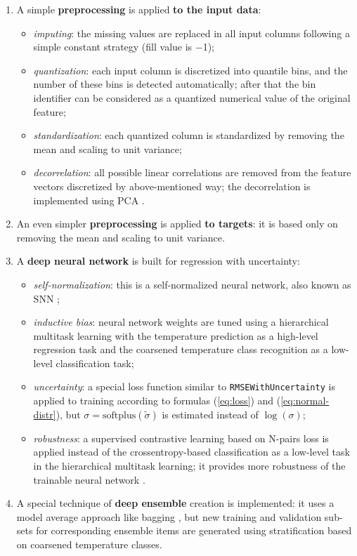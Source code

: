 \documentclass{article}
\begin{document}
\begin{enumerate}
    \item A simple \textbf{preprocessing} is applied \textbf{to the input data}:
        \begin{itemize} 
            \item \emph{imputing}: the missing values are replaced in all input columns following a simple constant strategy (fill value is $-$1);
            \item \emph{quantization}: each input column is discretized into quantile bins, and the number of these bins is detected automatically; after that the bin identifier can be considered as a quantized numerical value of the original feature; 
            \item \emph{standardization}: each quantized column is standardized by removing the mean and scaling to unit variance;
            \item \emph{decorrelation}: all possible linear correlations are removed from the feature vectors discretized by above-mentioned way; the decorrelation is implemented using PCA \cite{esbensen2002multivariate}.
        \end{itemize} 
    \item An even simpler \textbf{preprocessing} is applied \textbf{to targets}: it is based only on removing the mean and scaling to unit variance.
    \item A \textbf{deep neural network} is built for regression with uncertainty:
        \begin{itemize} 
            \item \emph{self-normalization}: this is a self-normalized neural network, also known as SNN \cite{Klambauer2017};
            \item \emph{inductive bias}: neural network weights are tuned using a hierarchical multitask learning with the temperature prediction as a high-level regression task and the coarsened temperature class recognition as a low-level classification task;
            \item \emph{uncertainty}: a special loss function similar to \verb+RMSEWithUncertainty+ \cite{Malinin2021gbtuncertainty} is applied to training according to formulas (\ref{eq:loss}) and (\ref{eq:normal-distr}), but \(\sigma = \mathrm{softplus}(\tilde{\sigma})\) is estimated instead of \(\log(\sigma)\);
            \item \emph{robustness}: a supervised contrastive learning based on N-pairs loss \cite{Sohn2016ImprovedDM} is applied instead of the crossentropy-based classification as a low-level task in the hierarchical multitask learning; it provides more robustness of the trainable neural network \cite{Khosla2020npairs}.
        \end{itemize}
    \item A special technique of \textbf{deep ensemble} creation is implemented: it uses a model average approach like bagging \cite{Breiman2004BaggingP}, but new training and validation sub-sets for corresponding ensemble items are generated using stratification based on coarsened temperature classes.
\end{enumerate}
\end{document}
